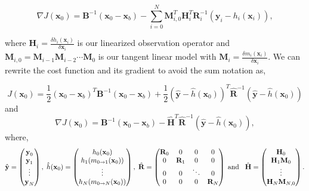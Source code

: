 \documentclass[11pt]{article}
\begin{document}
\begin{equation}
\nabla J(\textbf{x}_0) = \textbf{B}^{-1}(\textbf{x}_0-\textbf{x}_b)-\sum_{i=0}^{N}\textbf{M}_{i,0}^{T}\textbf{H}_i^{T}\textbf{R}_{i}^{-1}(\textbf{y}_i-h_i(\textbf{x}_i)),
\end{equation}

where $\textbf{H}_i = \frac{\delta h_i(\textbf{x}_i)}{\delta\textbf{x}_i}$ is our linearized observation operator and $\mathbf{M}_{i,0}=\mathbf{M}_{i-1}\mathbf{M}_{i-2}\cdots\mathbf{M}_0$ is our tangent linear model with $\mathbf{M}_i=\frac{\delta m_{i}(\textbf{x}_{i})}{\delta \textbf{x}_{i}}$. We can rewrite the cost function and its gradient to avoid the sum notation as,

\begin{equation}
J(\textbf{x}_0) = \frac{1}{2}(\textbf{x}_0-\textbf{x}_b)^{T}\textbf{B}^{-1}(\textbf{x}_0-\textbf{x}_b)+\frac{1}{2}(\hat{\textbf{y}}-\hat{h}(\textbf{x}_0))^{T}\hat{\textbf{R}}^{-1}(\hat{\textbf{y}}-\hat{h}(\textbf{x}_0)) \label{costfn}
\end{equation}
and
\begin{equation}
\nabla J(\textbf{x}_0) = \textbf{B}^{-1}(\textbf{x}_0-\textbf{x}_b)-\hat{\mathbf{H}}^{T}\hat{\textbf{R}}^{-1}(\hat{\textbf{y}}-\hat{h}(\textbf{x}_0)), \label{gradcostfn}
\end{equation}
where,
\begin{equation}
\hat{\textbf{y}}=
\begin{pmatrix}
\textbf{y}_0 \\
\textbf{y}_1\\
\vdots \\
\textbf{y}_N
\end{pmatrix},
\hspace{1mm}
\hat{h}(\textbf{x}_0)=
\begin{pmatrix}
h_0(\textbf{x}_0) \\
h_1(m_{0\rightarrow 1}(\mathbf{x}_{0}))\\
\vdots \\
h_N(m_{0\rightarrow N}(\mathbf{x}_{0}))
\end{pmatrix},
\hspace{1mm}
\hat{\mathbf{R}}=
\begin{pmatrix}
\mathbf{R}_0 & 0 & 0 & 0 \\
0 & \mathbf{R}_1 & 0 & 0 \\
0 & 0 & \ddots & 0 \\
0 & 0 & 0 & \mathbf{R}_N
\end{pmatrix}
\hspace{1mm} \text{and} \hspace{3mm}
\hat{\mathbf{H}}=
\begin{pmatrix}
\mathbf{H}_0 \\
\mathbf{H}_1\mathbf{M}_0\\
\vdots \\
\mathbf{H}_N\mathbf{M}_{N,0}
\end{pmatrix}.
\end{equation}
\end{document}
